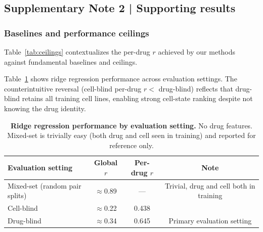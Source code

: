 \subsection*{Supplementary Note 2 | Supporting results}

\subsubsection*{Baselines and performance ceilings}

Table~\ref{tab:ceilings} contextualizes the per-drug $r$ achieved by our methods against fundamental baselines and ceilings.

\begin{table}[htbp]
\centering
\caption{\textbf{Per-drug $r$ in context of baselines and measurement ceiling.} Methods are ordered by value. Dagger indicates response matching, which uses $K$ pilot IC$_{50}$ measurements. All other methods are zero-shot.}
\label{tab:ceilings}
\end{table}

Table~\ref{tab:eval_settings} shows ridge regression performance across evaluation settings. The counterintuitive reversal (cell-blind per-drug $r <$ drug-blind) reflects that drug-blind retains all training cell lines, enabling strong cell-state ranking despite not knowing the drug identity.

\begin{table}[htbp]
\centering
\caption{\textbf{Ridge regression performance by evaluation setting.} No drug features. Mixed-set is trivially easy (both drug and cell seen in training) and reported for reference only.}
\label{tab:eval_settings}
\begin{tabular}{lccc}
\toprule
Evaluation setting & Global $r$ & Per-drug $r$ & Note \\
\midrule
Mixed-set (random pair splits) & $\approx$0.89 & --- & Trivial, drug and cell both in training \\
Cell-blind & $\approx$0.22 & 0.438 & \\
Drug-blind & $\approx$0.34 & 0.645 & Primary evaluation setting \\
\bottomrule
\end{tabular}
\end{table}

